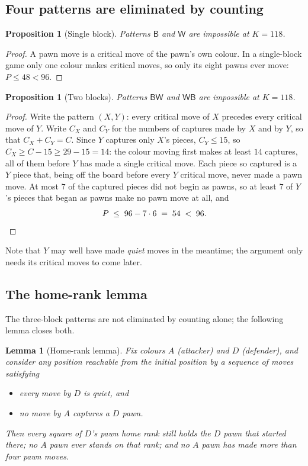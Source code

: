 \documentclass[11pt]{article}
\newtheorem{lemma}[theorem]{Lemma}
\newtheorem{proposition}[theorem]{Proposition}
\theoremstyle{definition}
\theoremstyle{remark}
\theoremstyle{plain}
\begin{document}
\subsection{Four patterns are eliminated by counting}

\begin{proposition}[Single block]\label{prop:oneblock}
Patterns $\mathsf{B}$ and $\mathsf{W}$ are impossible at $K = 118$.
\end{proposition}

\begin{proof}
A pawn move is a critical move of the pawn's own colour. In a single-block
game only one colour makes critical moves, so only its eight pawns ever
move: $P \le 48 < 96$.
\end{proof}

\begin{proposition}[Two blocks]\label{prop:twoblocks}
Patterns $\mathsf{BW}$ and $\mathsf{WB}$ are impossible at $K = 118$.
\end{proposition}

\begin{proof}
Write the pattern $(X, Y)$: every critical move of $X$ precedes every
critical move of $Y$. Write $C_X$ and $C_Y$ for the numbers of captures
made by $X$ and by $Y$, so that $C_X + C_Y = C$. Since $Y$ captures only
$X$'s pieces,
$C_Y \le 15$, so $C_X \ge C - 15 \ge 29 - 15 = 14$: the colour moving
first makes at least $14$ captures, all of them before $Y$ has made a
single critical move. Each piece so captured is a $Y$ piece that, being
off the board before every $Y$ critical move, never made a pawn move. At
most $7$ of the captured pieces did not begin as pawns, so at least $7$
of $Y$'s pieces that began as pawns make no pawn move at all, and
\[
  P \;\le\; 96 - 7 \cdot 6 \;=\; 54 \;<\; 96. \qedhere
\]
\end{proof}

Note that $Y$ may well have made \emph{quiet} moves in the meantime; the
argument only needs its critical moves to come later.

\subsection{The home-rank lemma}

The three-block patterns are not eliminated by counting alone; the
following lemma closes both.

\begin{lemma}[Home-rank lemma]\label{lem:homerank}
Fix colours $A$ (attacker) and $D$ (defender), and consider any position
reachable from the initial position by a sequence of moves satisfying
\begin{itemize}
  \item[\textup{(R1)}] every move by $D$ is quiet, and
  \item[\textup{(R2)}] no move by $A$ captures a $D$ pawn.
\end{itemize}
Then every square of $D$'s pawn home rank still holds the $D$ pawn that
started there; no $A$ pawn ever stands on that rank; and no $A$ pawn has
made more than four pawn moves.
\end{lemma}
\end{document}
